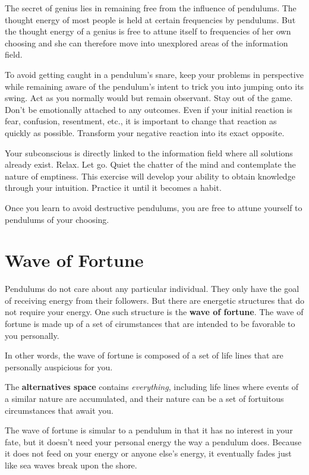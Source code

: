 \documentclass[
  openany]{book}
\begin{document}
The secret of genius lies in remaining free from the influence of pendulums. The thought energy of most people is held at certain frequencies by pendulums. But the thought energy of a genius is free to attune itself to frequencies of her own choosing and she can therefore move into unexplored areas of the information field.

To avoid getting caught in a pendulum's snare, keep your problems in perspective while remaining aware of the pendulum's intent to trick you into jumping onto its swing. Act as you normally would but remain observant. Stay out of the game. Don't be emotionally attached to any outcomes. Even if your initial reaction is fear, confusion, resentment, etc., it is important to change that reaction as quickly as possible. Transform your negative reaction into its exact opposite.

Your subconscious is directly linked to the information field where all solutions already exist. Relax. Let go. Quiet the chatter of the mind and contemplate the nature of emptiness. This exercise will develop your ability to obtain knowledge through your intuition. Practice it until it becomes a habit.

Once you learn to avoid destructive pendulums, you are free to attune yourself to pendulums of your choosing.

\hypertarget{wave-of-fortune}{%
\chapter{Wave of Fortune}\label{wave-of-fortune}}

Pendulums do not care about any particular individual. They only have the goal of receiving energy from their followers. But there are energetic structures that do not require your energy. One such structure is the \textbf{wave of fortune}. The wave of fortune is made up of a set of cirumstances that are intended to be favorable to you personally.

In other words, the wave of fortune is composed of a set of life lines that are personally auspicious for you.

The \textbf{alternatives space} contains \emph{everything}, including life lines where events of a similar nature are accumulated, and their nature can be a set of fortuitous circumstances that await you.

The wave of fortune is simular to a pendulum in that it has no interest in your fate, but it doesn't need your personal energy the way a pendulum does. Because it does not feed on your energy or anyone else's energy, it eventually fades just like sea waves break upon the shore.
\end{document}
